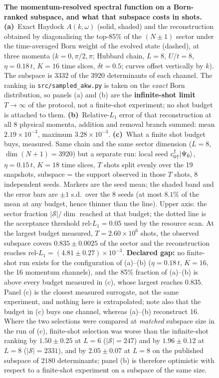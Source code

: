 \begin{figure}[htbp]\centering
\caption{\textbf{The momentum-resolved spectral function on a Born-ranked subspace, and what that
subspace costs in shots.}
\textbf{(a)}~Exact Haydock $A(k,\omega)$ (solid, shaded) and the reconstruction obtained by
diagonalising the top-85\% of the $(N{\pm}1)$ sector under the time-averaged Born weight of the
evolved state (dashed), at three momenta ($k=0,\pi/2,\pi$; Hubbard chain, $L=8$, $U/t=8$,
$\eta=0.18\,t$, $K=16$ time slices, $\delta t=0.5$; curves offset vertically by $k$).
The subspace is $3332$ of the $3920$ determinants of each channel. The ranking in
\texttt{src/sampled\_akw.py} is taken on the \emph{exact} Born distribution, so panels (a) and (b)
are the \textbf{infinite-shot limit} $T\rightarrow\infty$ of the protocol, not a finite-shot experiment;
no shot budget is attached to them.
\textbf{(b)}~Relative-$L_1$ error of that reconstruction at all 8 physical momenta, addition and
removal branch summed: mean $2.19\times10^{-3}$, maximum $3.28\times10^{-3}$.
\textbf{(c)}~What a finite shot budget buys, measured. Same chain and the same sector dimension
($L=8$, $\dim(N{+}1)=3920$) but a separate run: local seed $c^{\dagger}_{0\uparrow}\lvert \Psi_0 \rangle$,
$\eta=0.15\,t$, $K=18$ time slices, $T$ shots split evenly over the 19 snapshots, subspace
= the support observed in those $T$ shots, 8 independent seeds. Markers are the seed mean; the
shaded band and the error bars are $\pm1$ s.d.\ over the 8 seeds (at most $8.1\%$ of the
mean at any budget, hence thinner than the line). Upper axis: the sector fraction $|\mathcal S|/\dim$
reached at that budget; the dotted line is the acceptance threshold rel-$L_1=0.05$ used by the
resource scan. At the largest budget measured, $T=2.60\times10^{6}$ shots, the observed subspace covers
$0.835\pm0.0025$ of the sector and the reconstruction reaches
rel-$L_1=(4.81\pm0.27)\times10^{-3}$.
\textbf{Declared gap:} no finite-shot run exists for the configuration of (a)--(b)
($\eta=0.18\,t$, $K=16$, the 16 momentum channels), and the 85\% fraction of (a)--(b)
is above every budget measured in (c), whose largest reaches $0.835$. Panel (c) is the closest
measured surrogate, not the same experiment, and nothing here is extrapolated; note also that the
budget in (c) buys one channel, whereas (a)--(b) reconstruct 16. Where the two
selections were compared at \emph{matched} subspace size in the run of (c), finite-shot selection was
worse than the infinite-shot ranking by $1.50\pm0.25$ at $L=6$ ($|\mathcal S|=247$) and by
$1.96\pm0.12$ at $L=8$ ($|\mathcal S|=2331$), and by $2.05\pm0.07$ at $L=8$ on the published subspace
of $2180$ determinants; panel (b) is therefore optimistic with respect to
a finite-shot experiment on a subspace of the same size.}
\label{fig:akwsampled}
\end{figure}

